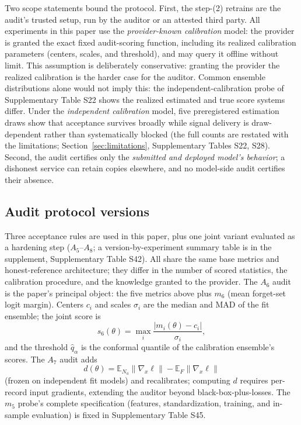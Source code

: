 \documentclass[lettersize,journal]{IEEEtran}
\begin{document}
Two scope statements bound the protocol. First, the step-(2)
retrains are the audit's trusted setup, run by the auditor or
an attested third party. All experiments in this
paper use the \emph{provider-known calibration} model: the
provider is granted the exact fixed audit-scoring function,
including its realized calibration parameters (centers,
scales, and threshold), and may query it offline without
limit. This assumption is deliberately conservative: granting
the provider the realized calibration is the harder case for
the auditor. Common ensemble distributions alone would not
imply this: the independent-calibration probe of
Supplementary Table S22 shows the realized estimated and
true score systems differ. Under the \emph{independent
calibration} model, five preregistered estimation draws show
that acceptance survives broadly while signal delivery is
draw-dependent rather than systematically blocked (the full
counts are restated with the limitations;
Section~\ref{sec:limitations}, Supplementary Tables S22,
S28). Second, the audit certifies only the \emph{submitted and
deployed model's behavior}; a dishonest service can retain
copies elsewhere, and no model-side audit certifies their
absence.


\subsection{Audit protocol versions}\label{sec:protocol-versions}
Three acceptance rules are used in this paper, plus one joint
variant evaluated as a hardening step ($A_5$--$A_8$; a
version-by-experiment summary table is in the supplement,
Supplementary Table S42). All share the same base metrics
and honest-reference architecture; they differ in the number
of scored statistics, the calibration procedure, and the
knowledge granted to the provider. The $A_6$ audit is the
paper's principal object: the five metrics above plus $m_6$
(mean forget-set logit margin). Centers $c_i$ and scales
$\sigma_i$ are the median and MAD of the fit ensemble; the
joint score is
\begin{equation}
\label{eq:a6}
s_6(\theta) = \max_i \frac{|m_i(\theta) - c_i|}{\sigma_i},
\end{equation}
and the threshold $\hat q_\alpha$ is the
conformal quantile of the calibration ensemble's scores. The
$A_7$ audit adds
\begin{equation}
\label{eq:a7}
d(\theta) = \mathbb{E}_{N_a}\|\nabla_x \ell\| -
\mathbb{E}_F\|\nabla_x \ell\|
\end{equation}
(frozen on independent fit models) and recalibrates; computing $d$
requires per-record input gradients, extending the auditor
beyond black-box-plus-losses. The $m_5$ probe's complete
specification (features, standardization, training, and
in-sample evaluation) is fixed in Supplementary Table S45.
\end{document}
